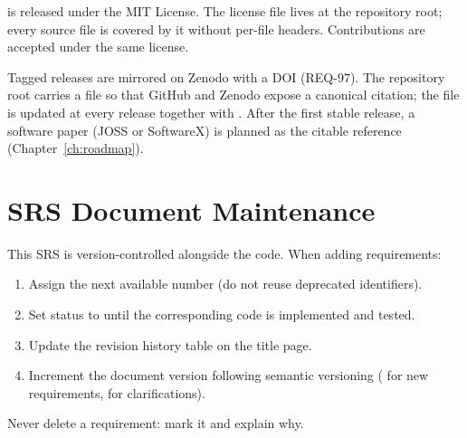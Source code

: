 \itc{} is released under the MIT License. The license file lives at the
repository root; every source file is covered by it without per-file
headers. Contributions are accepted under the same license.

Tagged releases are mirrored on Zenodo with a DOI (REQ-97). The
repository root carries a  file so that GitHub and
Zenodo expose a canonical citation; the file is updated at every release
together with . After the first stable release, a
software paper (JOSS or SoftwareX) is planned as the citable reference
(Chapter~\ref{ch:roadmap}).

\section{SRS Document Maintenance}

This SRS is version-controlled alongside the code. When adding
requirements:

\begin{enumerate}[noitemsep,topsep=2pt]
  \item Assign the next available  number (do not reuse
    deprecated identifiers).
  \item Set status to \draft{} until the corresponding code is
    implemented and tested.
  \item Update the revision history table on the title page.
  \item Increment the document version following semantic versioning
    ( for new requirements,  for clarifications).
\end{enumerate}

Never delete a requirement: mark it \deprecated{} and explain why.
